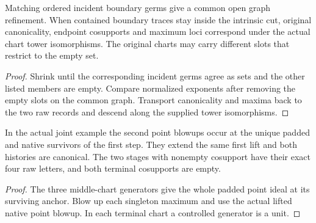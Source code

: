 \begin{theorem}
\label{hir:g1-native-graph-overlap-read}
\leanok
Matching ordered incident boundary germs give a common open
graph refinement. When contained boundary traces stay inside
the intrinsic cut, original canonicality, endpoint cosupports
and maximum loci correspond under the actual chart tower
isomorphisms. The original charts may carry different slots that
restrict to the empty set.
\end{theorem}
\begin{proof}
Shrink until the corresponding incident germs agree as sets
and the other listed members are empty. Compare normalized
exponents after removing the empty slots on the common graph.
Transport canonicality and maxima back to the two raw records
and descend along the supplied tower isomorphisms.
\end{proof}

\begin{theorem}
\label{hir:g1-advanced-head-terminal-example}
\leanok
In the actual joint example the second point blowups occur at
the unique padded and native survivors of the first step.
They extend the same first lift and both histories are canonical.
The two stages with nonempty cosupport have their exact four raw
letters, and both terminal cosupports are empty.
\end{theorem}
\begin{proof}
The three middle-chart generators give the whole padded point
ideal at its surviving anchor. Blow up each singleton maximum and
use the actual lifted native point blowup. In each terminal chart
a controlled generator is a unit.
\end{proof}

